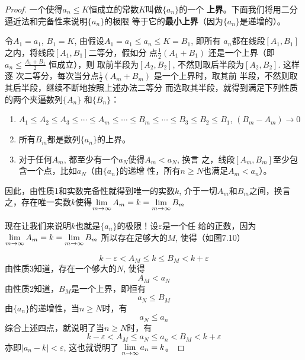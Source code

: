 \begin{proof}
    一个使得$a_n\le K$恒成立的常数$K$叫做$\{a_n\}$的一个
\textbf{上界}。下面我们将用二分逼近法和完备性来说明$\{a_n\}$的极限
等于它的\textbf{最小上界}（因为$\{a_n\}$是递增的）。

令$A_1=a_1$, $B_1=K$, 由假设$A_1=a_1\le a_n\le K=B_1$, 即所有
$a_n$都在线段$[A_1,B_1]$之内，将线段$[A_1,B_1]$二等分，假如分
点$\frac{1}{2}(A_1+B_1)$
还是一个上界（即$a_n\le \frac{A_1+B_1}{2}$
恒成立），则
取前半段为$[A_2,B_2]$, 不然则取后半段为$[A_2,B_2]$. 这样逐
次二等分，每次当分点$\frac{1}{2}(A_m+B_m)$
是一个上界时，取其前
半段，不然则取其后半段，继续不断地按照上述办法二等分
而选取其半段，就得到满足下列性质的两个夹逼数列$\{A_n\}$
和$\{B_n\}$：

\begin{enumerate}
    \item $A_1\le A_2\le A_3\le \cdots \le A_m\le \cdots \le B_m\le \cdots\le B_3\le B_2\le B_1$, $(B_m-A_m)\to 0$
    \item 所有$B_m$都是数列$\{a_n\}$的上界。
    \item 对于任何$A_m$, 都至少有一个$a_N$使得$A_m<a_N$, 换言
之，线段$[A_m,B_m]$至少包含一个点，比如$a_N$（由$\{a_n\}$的递增
性，所有$n\ge N$也满足$A_m<a_n$）。
\end{enumerate}

因此，由性质1和实数完备性就得到唯一的实数$k$, 
介于一切$A_m$和$B_m$之间，换言之，存在唯一实数$k$使得$\displaystyle\lim_{m\to\infty}A_m=k=\displaystyle\lim_{m\to\infty}B_m$

现在让我们来说明$k$也就是$\{a_n\}$的极限！设$\varepsilon$是一个任
给的正数，因为$\displaystyle\lim_{m\to\infty}A_m=k=\displaystyle\lim_{m\to\infty}B_m$
所以存在足够大的$M$, 使得（如图7.10）
\begin{figure}[htp]
    \centering

    \caption{}
\end{figure}
\begin{equation}
    k-\varepsilon<A_M\le k\le B_M<k+\varepsilon
\end{equation}
由性质3知道，存在一个够大的$N$, 使得
\begin{equation}
    A_M<a_N    
\end{equation}
由性质2知道，$B_M$是一个上界，即恒有
\begin{equation}
    a_N\le B_M
\end{equation} 
由$\{a_n\}$的递增性，当$n\ge N$时，有
\begin{equation}
    a_N\le a_n
\end{equation} 
综合上述四点，就说明了当$n\ge N$时，有
\[k-\varepsilon<A_M\le a_N\le a_n<B_M<k+\varepsilon\]
亦即$|a_n-k|<\varepsilon$, 这也就说明了
$\displaystyle\lim_{n\to\infty}a_n=k$。
\end{proof}








